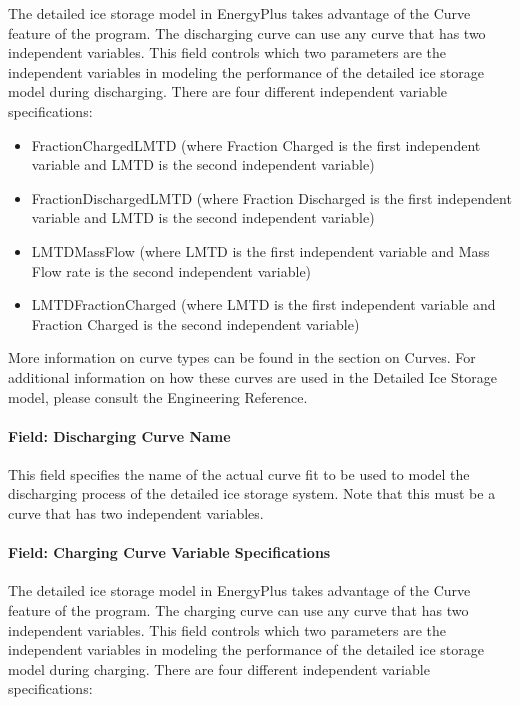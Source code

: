 The detailed ice storage model in EnergyPlus takes advantage of the Curve feature of the program.  The discharging curve can use any curve that has two independent variables.  This field controls which two parameters are the independent variables in modeling the performance of the detailed ice storage model during discharging. There are four different independent variable specifications:

\begin{itemize}
\item
FractionChargedLMTD (where Fraction Charged is the first independent variable and LMTD is the second independent variable)
\item 
FractionDischargedLMTD (where Fraction Discharged is the first independent variable and LMTD is the second independent variable)
\item
LMTDMassFlow (where LMTD is the first independent variable and Mass Flow rate is the second independent variable)
\item
LMTDFractionCharged (where LMTD is the first independent variable and Fraction Charged is the second independent variable)
\end{itemize}

More information on curve types can be found in the section on Curves.  For additional information on how these curves are used in the Detailed Ice Storage model, please consult the Engineering Reference.

\paragraph{Field: Discharging Curve Name}\label{field-discharging-curve-name}

This field specifies the name of the actual curve fit to be used to model the discharging process of the detailed ice storage system. Note that this must be a curve that has two independent variables.

\paragraph{Field: Charging Curve Variable Specifications}\label{field-charging-curve-variable-specifications}

The detailed ice storage model in EnergyPlus takes advantage of the Curve feature of the program.  The charging curve can use any curve that has two independent variables.  This field controls which two parameters are the independent variables in modeling the performance of the detailed ice storage model during charging. There are four different independent variable specifications:


